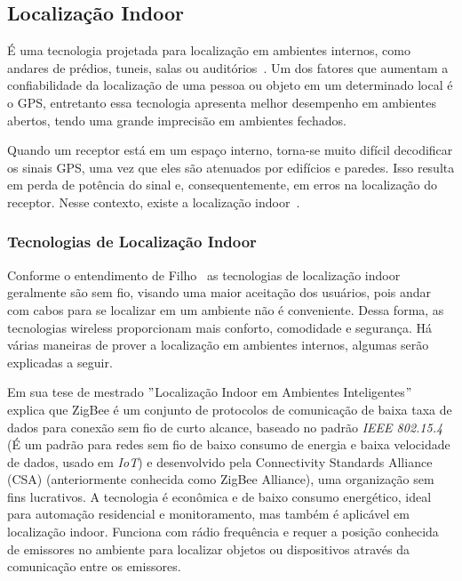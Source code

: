 \subsection{Localização Indoor}\label{subsec:localizacao-indoor}

É uma tecnologia projetada para localização em ambientes internos, como andares de prédios, tuneis, salas ou auditórios~\cite{mittelstadt2018bluepath}.
Um dos fatores que aumentam a confiabilidade da localização de uma pessoa ou objeto em um determinado local é o GPS, entretanto essa tecnologia apresenta melhor desempenho em ambientes abertos, tendo uma grande imprecisão em ambientes fechados.

Quando um receptor está em um espaço interno, torna-se muito difícil decodificar os sinais GPS, uma vez que eles são atenuados por edifícios e paredes.
Isso resulta em perda de potência do sinal e, consequentemente, em erros na localização do receptor.
Nesse contexto, existe a localização indoor~\cite{mittelstadt2018bluepath}.

\subsubsection{Tecnologias de Localização Indoor}\label{subsubsec:tecnologias-localizacao-indoor}
Conforme o entendimento de Filho~\cite{mittelstadt2018bluepath} as tecnologias de localização indoor geralmente são sem fio, visando uma maior aceitação dos usuários, pois andar com cabos para se localizar em um ambiente não é conveniente.
Dessa forma, as tecnologias wireless proporcionam mais conforto, comodidade e segurança.
Há várias maneiras de prover a localização em ambientes internos, algumas serão explicadas a seguir.

\label{subsubsubsec:zigbee}
Em sua tese de mestrado \("\)Localização Indoor em Ambientes Inteligentes\("\)~\cite{novais2014localizaccao} explica que ZigBee é um conjunto de protocolos de comunicação de baixa taxa de dados para conexão sem fio de curto alcance, baseado no padrão \textit{IEEE 802.15.4} (É um padrão para redes sem fio de baixo consumo de energia e baixa velocidade de dados, usado em \textit{IoT}) e desenvolvido pela Connectivity Standards Alliance (CSA) (anteriormente conhecida como ZigBee Alliance), uma organização sem fins lucrativos.
A tecnologia é econômica e de baixo consumo energético, ideal para automação residencial e monitoramento, mas também é aplicável em localização indoor.
Funciona com rádio frequência e requer a posição conhecida de emissores no ambiente para localizar objetos ou dispositivos através da comunicação entre os emissores.

